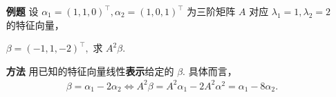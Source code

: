 \begin{enumerate}
    \item[\textbf{例题}] 设 $ \alpha_1 = (1,1,0)^\top, \alpha_2 = (1,0,1)^\top $ 为三阶矩阵 $ A $ 对应
    $ \lambda_1 = 1, \lambda_2 = 2 $ 的特征向量，
    
    $ \beta = (-1,1,-2)^\top, $ 求 $ A^2\beta. $ 
    \item[\textbf{方法}]
    用已知的特征向量线性\textbf{表示}给定的 $ \beta. $ 具体而言，
    \begin{equation*}
        \begin{aligned}
            \beta = \alpha_1 - 2\alpha_2 
            \Leftrightarrow  A^2\beta = A^2\alpha_1 - 2A^2\alpha^2 
            = \alpha_1 - 8\alpha_2.
        \end{aligned}
    \end{equation*}
\end{enumerate} 



